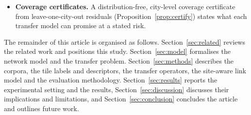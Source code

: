 \begin{itemize}
link model conditioned on the obstruction geometry of each link outperforms
the tile model with perfect labels in path loss, serving site and planning
in every held-out city, and the non-learned per-link baselines (free space
with single and multiple knife edges, 3GPP UMa with geometric line of
sight) in path loss and serving site, across bands, site placements, materials and
independently modelled scenes; a small unbiased survey calibrates its
per-site offsets with an empirical-Bayes prior.
\item \textbf{Coverage certificates.} A distribution-free, city-level
coverage certificate from leave-one-city-out residuals
(Proposition~\ref{prop:certify}) states what each transfer model can promise
at a stated risk.
\end{itemize}

The remainder of this article is organised as follows.
Section~\ref{sec:related} reviews the related work and positions this
study. Section~\ref{sec:model} formalises the network model and the transfer
problem. Section~\ref{sec:methods} describes the corpora, the tile labels
and descriptors, the transfer operators, the site-aware link model and the
evaluation methodology. Section~\ref{sec:results} reports the experimental
setting and the results, Section~\ref{sec:discussion} discusses their
implications and limitations, and Section~\ref{sec:conclusion} concludes
the article and outlines future work.
